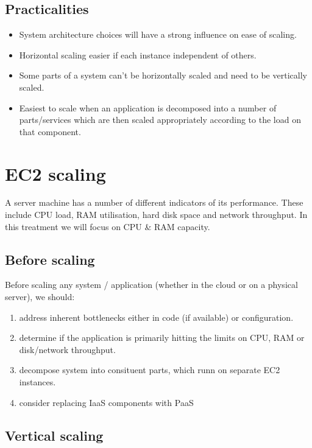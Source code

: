 \documentclass[slides]{pgnotes}
\begin{document}
\subsection{Practicalities}

\begin{itemize}
\item System architecture choices will have a strong influence on ease of scaling.
\item Horizontal scaling easier if each instance independent of others.
\item Some parts of a system can't be horizontally scaled and need to be vertically scaled.
\item Easiest to scale when an application is decomposed into a number of parts/services which are then scaled appropriately according to the load on that component.
\end{itemize}

\newpage
\section{EC2 scaling}

A server machine has a number of different indicators of its performance.
These include CPU load, RAM utilisation, hard disk space and network throughput.
In this treatment we will focus on CPU \& RAM capacity.

\subsection{Before scaling}

Before scaling any system / application (whether in the cloud or on a physical server), we should:
\begin{enumerate}
\item address inherent bottlenecks either in code (if available) or configuration. 
\item determine if the application is primarily hitting the limits on CPU, RAM or disk/network throughput.
\item decompose system into consituent parts, which runn on separate EC2 instances.
\item consider replacing IaaS components with PaaS
\end{enumerate}

\subsection{Vertical scaling}
\end{document}
